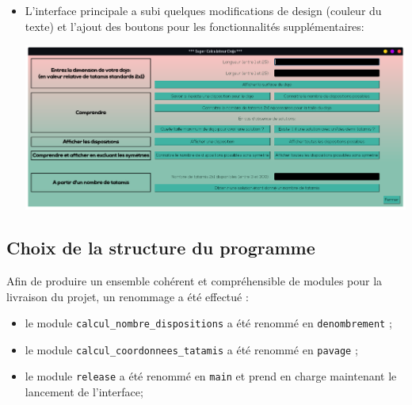 \begin{itemize}
    \item L’interface principale a subi quelques modifications de design (couleur du texte) et l’ajout des boutons pour les
          fonctionnalités supplémentaires:

          \begin{center}
              \includegraphics[scale=0.25]{images/prodInterface.png}
          \end{center}

\end{itemize}

\subsection{Choix de la structure du programme}


Afin de produire un ensemble cohérent et compréhensible de modules pour la livraison du projet,
un renommage a été effectué :
\begin{itemize}
    \item le module \texttt{calcul\_nombre\_dispositions} a été renommé en \texttt{denombrement} ;
    \item le module \texttt{calcul\_coordonnees\_tatamis} a été renommé en \texttt{pavage} ;
    \item le module \texttt{release} a été renommé en \texttt{main} et prend en charge maintenant le lancement de l'interface;
\end{itemize}

